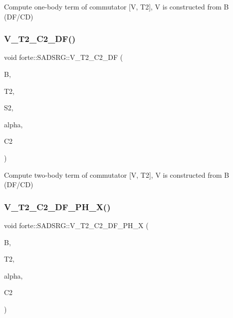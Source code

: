 Compute one-\/body term of commutator \mbox{[}V, T2\mbox{]}, V is constructed from B (D\+F/\+CD) 

\mbox{\label{classforte_1_1_s_a_d_s_r_g_a3de5f31e3f5aaa27389cdab8f704d46e}} 
\subsubsection{\texorpdfstring{V\+\_\+\+T2\+\_\+\+C2\+\_\+\+D\+F()}{V\_T2\_C2\_DF()}}
{\footnotesize\ttfamily void forte\+::\+S\+A\+D\+S\+R\+G\+::\+V\+\_\+\+T2\+\_\+\+C2\+\_\+\+DF (\begin{DoxyParamCaption}\item[{Blocked\+Tensor \&}]{B,  }\item[{Blocked\+Tensor \&}]{T2,  }\item[{Blocked\+Tensor \&}]{S2,  }\item[{const double \&}]{alpha,  }\item[{Blocked\+Tensor \&}]{C2 }\end{DoxyParamCaption})\hspace{0.3cm}{\ttfamily [protected]}}



Compute two-\/body term of commutator \mbox{[}V, T2\mbox{]}, V is constructed from B (D\+F/\+CD) 

\mbox{\label{classforte_1_1_s_a_d_s_r_g_a9fb7c6e7068a079650039097e4e4e929}} 
\subsubsection{\texorpdfstring{V\+\_\+\+T2\+\_\+\+C2\+\_\+\+D\+F\+\_\+\+P\+H\+\_\+\+X()}{V\_T2\_C2\_DF\_PH\_X()}}
{\footnotesize\ttfamily void forte\+::\+S\+A\+D\+S\+R\+G\+::\+V\+\_\+\+T2\+\_\+\+C2\+\_\+\+D\+F\+\_\+\+P\+H\+\_\+X (\begin{DoxyParamCaption}\item[{Blocked\+Tensor \&}]{B,  }\item[{Blocked\+Tensor \&}]{T2,  }\item[{const double \&}]{alpha,  }\item[{Blocked\+Tensor \&}]{C2 }\end{DoxyParamCaption})\hspace{0.3cm}{\ttfamily [protected]}}



